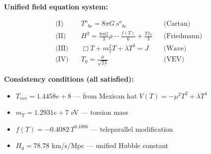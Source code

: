 
\textbf{Unified field equation system:}

\begin{align}
  \text{(I)} \quad & T^a{}_{bc} = 8\pi G \, s^a{}_{bc} && \text{(Cartan)} \\
  \text{(II)} \quad & H^2 = \frac{8\pi G}{3}\rho - \frac{f(T)}{6} + \frac{Tf_T}{3} && \text{(Friedmann)} \\
  \text{(III)} \quad & \Box T + m_T^2 T + \lambda T^3 = J && \text{(Wave)} \\
  \text{(IV)} \quad & T_0 = \frac{\mu}{\sqrt{2\lambda}} && \text{(VEV)}
\end{align}

\textbf{Consistency conditions (all satisfied):}
\begin{itemize}
  \item $T_{\text{vev}} = 1.4458e+8$ — from Mexican hat $V(T) = -\mu^2 T^2 + \lambda T^4$
  \item $m_T = 1.2931e+7$ eV — torsion mass
  \item $f(T) = -0.4082 \, T^{0.1006}$ — teleparallel modification
  \item $H_0 = 78.78$ km/s/Mpc — unified Hubble constant
\end{itemize}